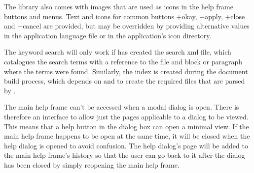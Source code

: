 \documentclass[toc=listof]{scrreport}
\begin{document}
The library also comes with images that are used as icons in the
help frame buttons and \glspl{menu}. Text and icons for common buttons 
\widget+{okay}, \widget+{apply}, \widget+{close} and
\widget+{cancel} are provided, but may be overridden by
providing alternative values in the application language file
or in the application's icon directory.

The keyword search will only work if  has created
the search \gls{xml} file, which catalogues the search terms with a
reference to the file and block or paragraph where the terms were
found. Similarly, the index is created during the document build
process, which depends on  and 
to create the required files that are parsed by .

The main help frame can't be accessed when a modal dialog is open.
There is therefore an interface to allow just the pages applicable
to a dialog to be viewed. This means that a help button in the
dialog box can open a minimal view. If the main help frame happens
to be open at the same time, it will be closed when the help dialog
is opened to avoid confusion. The help dialog's page will be added
to the main help frame's history so that the user can go back to it
after the dialog has been closed by simply reopening the main help
frame.





\printmain

\printindex
\end{document}
